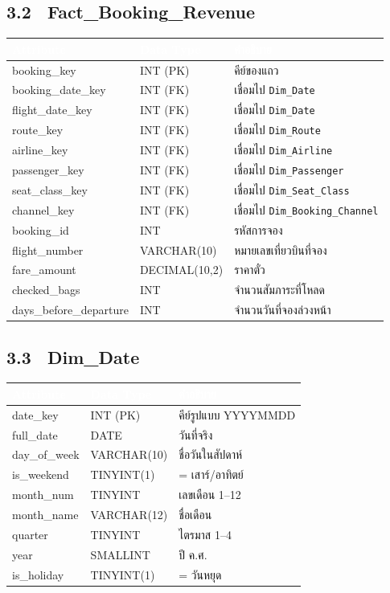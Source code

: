 \documentclass[11pt]{article}
\makeatletter
\newcommand{\code}[1]{\texttt{#1}}
\newcommand{\atthead}{\rowcolor{tblHead}
  \textcolor{white}{\textbf{Attribute}} & \textcolor{white}{\textbf{Data Type}} & \textcolor{white}{\textbf{คำอธิบาย}}\\}
\newenvironment{atttable}[1]%
  {\subsection*{#1}\vspace{-4pt}
   \begin{tabular}{@{}>{\ttfamily\small}p{4.3cm} >{\small}p{2.7cm} >{\small\raggedright\arraybackslash}p{9.4cm}@{}}
   \toprule\atthead \midrule}%
  {\bottomrule\end{tabular}\vspace{3pt}}
\makeatother
\begin{document}
\begin{atttable}{3.2 \ Fact_Booking_Revenue}
booking_key         & INT (PK)      & คีย์ของแถว\\
booking_date_key    & INT (FK)      & เชื่อมไป \code{Dim_Date} \\
flight_date_key     & INT (FK)      & เชื่อมไป \code{Dim_Date} \\
route_key           & INT (FK)      & เชื่อมไป \code{Dim_Route}\\
airline_key         & INT (FK)      & เชื่อมไป \code{Dim_Airline}\\
passenger_key       & INT (FK)      & เชื่อมไป \code{Dim_Passenger}\\
seat_class_key      & INT (FK)      & เชื่อมไป \code{Dim_Seat_Class}\\
channel_key         & INT (FK)      & เชื่อมไป \code{Dim_Booking_Channel}\\
booking_id          & INT           & รหัสการจอง\\
flight_number       & VARCHAR(10)   & หมายเลขเที่ยวบินที่จอง\\
fare_amount         & DECIMAL(10,2) & ราคาตั๋ว\\
checked_bags        & INT           & จำนวนสัมภาระที่โหลด\\
days_before_departure & INT         & จำนวนวันที่จองล่วงหน้า\\
\end{atttable}

\begin{atttable}{3.3 \ Dim_Date }
date_key    & INT (PK)    & คีย์รูปแบบ YYYYMMDD\\
full_date   & DATE        & วันที่จริง\\
day_of_week & VARCHAR(10) & ชื่อวันในสัปดาห์\\
is_weekend  & TINYINT(1)  & 1 = เสาร์/อาทิตย์\\
month_num   & TINYINT     & เลขเดือน 1–12\\
month_name  & VARCHAR(12) & ชื่อเดือน\\
quarter     & TINYINT     & ไตรมาส 1–4\\
year        & SMALLINT    & ปี ค.ศ.\\
is_holiday  & TINYINT(1)  & 1 = วันหยุด\\
\end{atttable}
\end{document}
